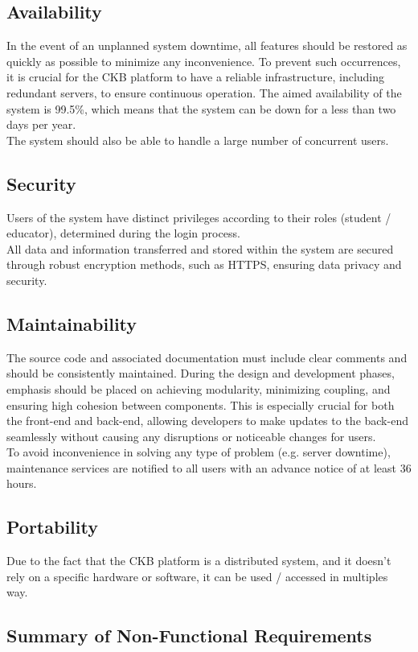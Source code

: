 \subsection{Availability}
In the event of an unplanned system downtime, all features should be restored as quickly as possible to minimize any inconvenience. To prevent such occurrences, it is crucial for the CKB platform to have a reliable infrastructure, including redundant servers, to ensure continuous operation.
The aimed availability of the system is 99.5\%, which means that the system can be down for a less than two days per year.\\
The system should also be able to handle a large number of concurrent users.

\subsection{Security}
Users of the system have distinct privileges according to their roles (student / educator), determined during the login process.\\
All data and information transferred and stored within the system are secured through robust encryption methods, such as HTTPS, ensuring data privacy and security.\\

\subsection{Maintainability}
The source code and associated documentation must include clear comments and should be consistently maintained. During the design and development phases, emphasis should be placed on achieving modularity, minimizing coupling, and ensuring high cohesion between components.
This is especially crucial for both the front-end and back-end, allowing developers to make updates to the back-end seamlessly without causing any disruptions or noticeable changes for users.\\
To avoid inconvenience in solving any type of problem (e.g. server downtime), maintenance services are notified to all users with an advance notice of at least 36 hours.

\subsection{Portability}
Due to the fact that the CKB platform is a distributed system, and it doesn't rely on a specific hardware or software, it can be used / accessed in multiples way.\\

{\color{red}\subsection*{Summary of Non-Functional Requirements}}
